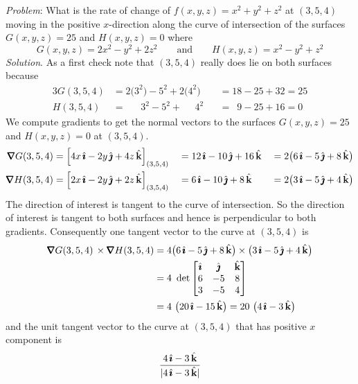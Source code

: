 \begin{eg}\label{eg dir deriv D}
\noindent\textit{Problem}:
What is the rate of change of $f(x,y,z)=x^2+y^2+z^2$ at $(3,5,4)$ moving 
in the positive $x$-direction along the curve of intersection of
the surfaces $G(x,y,z)=25$ and $H(x,y,z)=0$ where
\begin{equation*}
G(x,y,z)=2x^2-y^2+2z^2 \qquad\text{and}\qquad
H(x,y,z)=x^2-y^2+z^2
\end{equation*}
\medskip
\noindent\textit{Solution}. 
As a first check note that $(3,5,4)$
really does lie on both surfaces because
\begin{alignat*}{3}
G(3,5,4)&= 2\big(3^2\big)-5^2+2\big(4^2\big) &&= 18-25+32=25  \\
H(3,5,4)&=\phantom{2*\ }3^2-5^2+\phantom{2*}4^2&&=\phantom{1}9-25+16 =0
\end{alignat*}
We compute gradients to get the normal vectors to the surfaces 
$G(x,y,z)=25$ and $H(x,y,z)=0$ at $(3,5,4)$.
\begin{alignat*}{5}
\vnabla G(3,5,4) &=\Big[4x\,\hi-2y\,\hj+4z\,\hk\Big]_{(3,5,4)}
                 &&= 12\,\hi-10\,\hj+16\,\hk 
                 &&= 2\big(6\,\hi-5\,\hj+8\,\hk\big) \\
\vnabla H(3,5,4) &=\Big[2x\,\hi-2y\,\hj+2z\,\hk\Big]_{(3,5,4)}
                 &&= 6\,\hi-10\,\hj+8\,\hk 
                 &&= 2\big(3\,\hi-5\,\hj+4\,\hk\big) 
\end{alignat*}
The direction of interest is tangent to the curve of intersection.
So the direction of interest is tangent to both surfaces and hence is
perpendicular to both gradients. Consequently one tangent vector to the 
curve at $(3,5,4)$ is
\begin{align*}
\vnabla G(3,5,4)\,\times  \vnabla H(3,5,4)
&=4\big(6\,\hi-5\,\hj+8\,\hk\big)\times\big(3\,\hi-5\,\hj+4\,\hk\big) \\
&=4\ \det\left[\begin{matrix}
             \hi & \hj & \hk \\
             6   & -5  & 8 \\
             3   & -5  & 4 
           \end{matrix}\right] \\
&= 4\ \big(20\,\hi -15\,\hk\big)
= 20\ \big(4\,\hi -3\,\hk\big)
\end{align*}
and the unit tangent vector to the curve at $(3,5,4)$ that has
positive $x$ component is 
\begin{equation*}
\frac{4\,\hi -3\,\hk}{|4\,\hi -3\,\hk|}

\end{equation*}
\end{eg}
